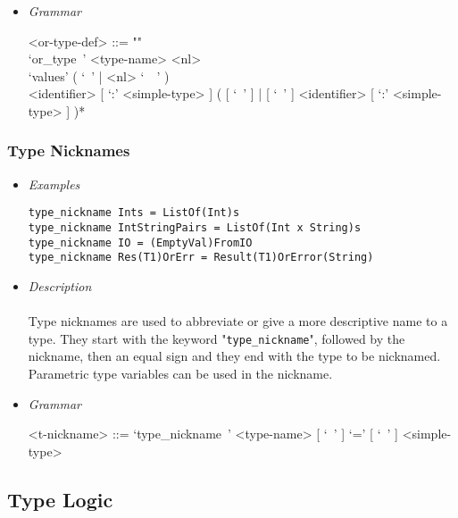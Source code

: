 \documentclass{article}
\begin{document}
\begin{itemize}
\item \textit{Grammar}

\begin{grammar}
<or-type-def> ::= ""\\
`or_type\ ' <type-name> <nl> \\
`values' ( `\ ' | <nl> `\ \ ' ) \\ 
<identifier> [ `:' <simple-type> ]
( [ `\ ' ] | [ `\ ' ] <identifier> [ `:' <simple-type> ] )*
\end{grammar}

\end{itemize}

\subsubsection{Type Nicknames}

\begin{itemize}

\item \textit{Examples}

\begin{verbatim}
type_nickname Ints = ListOf(Int)s
type_nickname IntStringPairs = ListOf(Int x String)s
type_nickname IO = (EmptyVal)FromIO
type_nickname Res(T1)OrErr = Result(T1)OrError(String)
\end{verbatim}

\item \textit{Description} \\\\
Type nicknames are used to abbreviate or give a more descriptive name to a type.
They start with the keyword "\texttt{type_nickname}", followed by the nickname, 
then an equal sign and they end with the type to be nicknamed. Parametric
type variables can be used in the nickname.

\item \textit{Grammar}

\begin{grammar}
<t-nickname> ::= `type_nickname\ ' <type-name> [ `\ ' ] `=' [ `\ ' ] <simple-type>
\end{grammar} 

\end{itemize}

\subsection{Type Logic}
\label{subsec:typelogic}
\end{document}
